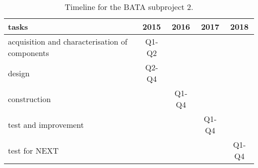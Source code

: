 \begin{table}
\begin{center}
\begin{tabular}{| l | c | c | c | c |}
\hline
tasks & 2015 & 2016 & 2017 & 2018 \\
\hline
acquisition and characterisation of components  & Q1-Q2 & & &  \\
design  & Q2-Q4  & & & \\
construction &  & Q1-Q4 & & \\
test and improvement &  & & Q1-Q4 & \\
test for NEXT & & &  & Q1-Q4\\
\hline
\hline
\end{tabular}
\caption{Timeline for the BATA subproject 2.}
\end{center}
\end{table}
